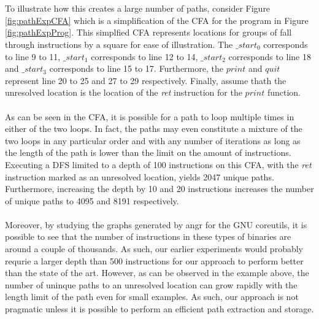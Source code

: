 \documentclass{kththesis}
\renewcommand{\it}[1]{\textit{#1}}
\begin{document}
\\ \\
To illustrate how this creates a large number of paths, consider Figure \ref{fig:pathExpCFA} which is a simplification of the CFA for the program in Figure \ref{fig:pathExpProg}. This simplfied CFA represents locations for groups of fall through instructions by a square for ease of illustration. The $\_start_0$ corresponds to line 9 to 11, $\_start_1$ corresponds to line 12 to 14, $\_start_2$ corresponds to line 18 and $\_start_3$ corresponds to line 15 to 17. Furthermore, the $print$ and $quit$ represent line 20 to 25 and 27 to 29 respectively. Finally, assume thath the unresolved location is the location of the \it{ret} instruction for the $print$ function. 
\\ \\
As can be seen in the CFA, it is possible for a path to loop multiple times in either of the two loops. In fact, the paths may even constitute a mixture of the two loops in any particular order and with any number of iterations as long as the length of the path is lower than the limit on the amount of instructions. Executing a DFS limited to a depth of 100 instructions on this CFA, with the \it{ret} instruction marked as an unresolved location, yields 2047 unique paths. Furthermore, increasing the depth by 10 and 20 instructions increases the number of unique paths to 4095 and 8191 respectively. 
\\ \\
Moreover, by studying the graphs generated by angr for the GNU coreutils, it is possible to see that the number of instructions in these types of binaries are around a couple of thousands. As such, our earlier experiments would probably requrie a larger depth than 500 instructions for our approach to perform better than the state of the art. However, as can be observed in the example above, the number of uninque paths to an unresolved location can grow rapidly with the length limit of the path even for small examples. As such, our approach is not pragmatic unless it is possible to perform an efficient path extraction and storage.

\end{document}
